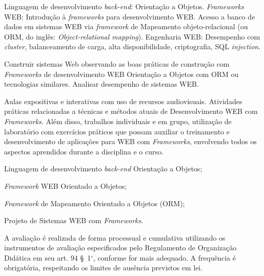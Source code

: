 \begin{pud}
	
	
	\ementa
	Linguagem de desenvolvimento \textit{back-end}: Orientação a Objetos. \textit{Frameworks} WEB: Introdução à \textit{frameworks} para desenvolvimento WEB. Acesso a banco de dados em sistemas WEB via \textit{framework} de Mapeamento objeto-relacional (ou ORM, do inglês: \textit{Object-relational mapping}). Engenharia WEB: Desempenho com \textit{cluster}, balanceamento de carga, alta disponibilidade, criptografia, SQL \textit{injection}.
	
	\objetivos
	Construir sistemas Web observando as boas práticas de construção com \textit{Frameworks} de desenvolvimento WEB Orientação a Objetos com ORM ou tecnologias similares.  Analisar desempenho de sistemas WEB.
	
	\metodologia
	Aulas expositivas e interativas com uso de recursos audiovisuais. Atividades práticas relacionadas a técnicas e métodos atuais de Desenvolvimento WEB com \textit{Frameworks}. Além disso, trabalhos individuais e em grupo, utilização de laboratório com exercícios práticos que possam auxiliar o treinamento e desenvolvimento de aplicações para WEB com \textit{Frameworks}, envolvendo todos os aspectos aprendidos durante a disciplina e o curso.    
	
	
	\programa
	\begin{description}[itemsep=0em]
		\item[UNIDADE I:] Linguagem de desenvolvimento \textit{back-end} Orientação a Objetos;
	    \item[UNIDADE II:]  \textit{Framework} WEB Orientado a Objetos;
        \item[UNIDADE III:] \textit{Framework} de Mapeamento Orientado a Objetos (ORM);
        \item[UNIDADE IV:] Projeto de Sistemas WEB com \textit{Frameworks}.
	\end{description}
	
	
	\avaliacao
	A avaliação é realizada de forma processual e cumulativa utilizando os instrumentos de avaliação especificados pelo Regulamento de Organização Didática em seu art. 94 \S~1$^\circ$, conforme for mais adequado. A frequência é obrigatória, respeitando os limites de ausência previstos em lei.
	
	
	\clearpage
	
	\begin{bibbasica}
			

\end{bibbasica}
\end{pud}
